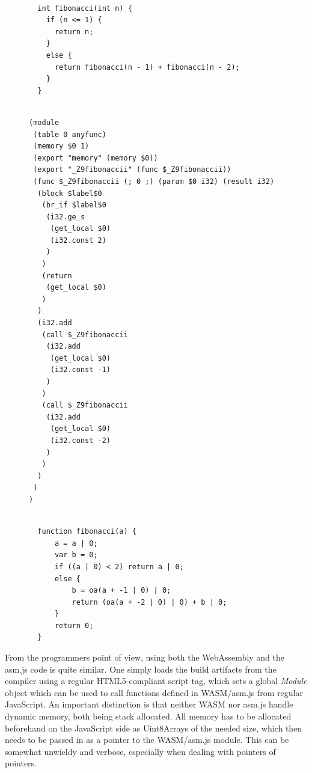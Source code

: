 \documentclass[conference]{IEEEtran}
\begin{document}
\begin{figure}[h]
  \begin{minipage}[t]{0.30\textwidth}
  \begin{lstlisting}[caption={Nth Fibonacci (C++)},label=cfibo, basicstyle=\scriptsize]

  int fibonacci(int n) {
    if (n <= 1) {
      return n;
    }
    else {
      return fibonacci(n - 1) + fibonacci(n - 2);
    }
  }
  \end{lstlisting}
\end{minipage}%
\begin{minipage}[t]{0.40\textwidth}
  \begin{lstlisting}[caption={Nth Fibonacci (WASM)},label=wasmfibo, basicstyle=\scriptsize]

(module
 (table 0 anyfunc)
 (memory $0 1)
 (export "memory" (memory $0))
 (export "_Z9fibonaccii" (func $_Z9fibonaccii))
 (func $_Z9fibonaccii (; 0 ;) (param $0 i32) (result i32)
  (block $label$0
   (br_if $label$0
    (i32.ge_s
     (get_local $0)
     (i32.const 2)
    )
   )
   (return
    (get_local $0)
   )
  )
  (i32.add
   (call $_Z9fibonaccii
    (i32.add
     (get_local $0)
     (i32.const -1)
    )
   )
   (call $_Z9fibonaccii
    (i32.add
     (get_local $0)
     (i32.const -2)
    )
   )
  )
 )
)
  \end{lstlisting}
\end{minipage}%
\begin{minipage}[t]{0.30\textwidth}
  \begin{lstlisting}[caption={Nth Fibonacci (asm.js)},label=asmfibo, basicstyle=\scriptsize]

  function fibonacci(a) {
      a = a | 0;
      var b = 0;
      if ((a | 0) < 2) return a | 0;
      else {
          b = oa(a + -1 | 0) | 0;
          return (oa(a + -2 | 0) | 0) + b | 0;
      }
      return 0;
  }
  \end{lstlisting}
\end{minipage}
\end{figure}

From the programmers point of view, using both the WebAssembly and the
asm.js code is quite similar. One simply loads the build artifacts from the
compiler using a regular HTML5-compliant script tag, which sets a global
\emph{Module} object which can be used to call functions defined in WASM/asm.js
from regular JavaScript. An important distinction is that neither WASM nor
asm.js handle dynamic memory, both being stack allocated. All memory has to be
allocated beforehand on the JavaScript side as Uint8Arrays of the needed size,
which then needs to be passed in as a pointer to the WASM/asm.js module. This
can be somewhat unwieldy and verbose, especially when dealing with pointers of
pointers.
\end{document}

